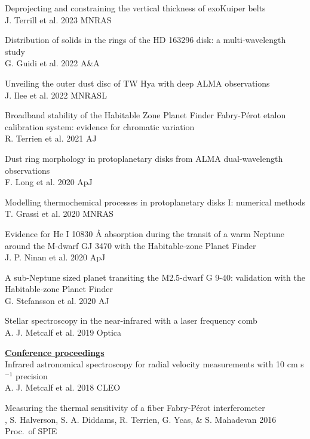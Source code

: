 \documentclass[10pt,preprint]{aastex}
\begin{document}
\noindent Deprojecting and constraining the vertical thickness of exoKuiper belts \\
\indent J. Terrill et al. 2023 MNRAS

\noindent Distribution of solids in the rings of the HD 163296 disk: a multi-wavelength study \\
\indent G. Guidi et al. 2022 A\&A 

\noindent Unveiling the outer dust disc of TW Hya with deep ALMA observations \\
\indent J. Ilee et al. 2022 MNRASL

\noindent Broadband stability of the Habitable Zone Planet Finder Fabry-P{\'e}rot etalon calibration system: evidence for chromatic variation \\
\indent R. Terrien et al. 2021 AJ 

\noindent Dust ring morphology in protoplanetary disks from ALMA dual-wavelength observations \\
\indent F. Long et al. 2020 ApJ 

\noindent Modelling thermochemical processes in protoplanetary
disks I: numerical methods \\
\indent T. Grassi et al. 2020 MNRAS

\noindent Evidence for He I 10830 \si{\angstrom} absorption during the transit of a warm Neptune around the M-dwarf GJ 3470 with the Habitable-zone Planet Finder \\
\indent J. P. Ninan et al. 2020 ApJ

\noindent A sub-Neptune sized planet transiting the M2.5-dwarf G 9-40: validation with the Habitable-zone Planet Finder \\
\indent G. Stefansson et al. 2020 AJ

\noindent Stellar spectroscopy in the near-infrared with a laser frequency comb \\
\indent A. J. Metcalf et al. 2019 Optica 

\noindent \underline{{\bf Conference proceedings}} \\
\noindent Infrared astronomical spectroscopy for radial velocity
measurements with 10 cm s$^{-1}$ precision \\
\indent A. J. Metcalf et al. 2018 CLEO

\noindent Measuring the thermal sensitivity of a fiber Fabry-P{\'e}rot interferometer \\
, S. Halverson, S. A. Diddams, R. Terrien, G. Ycas, \& S. Mahadevan 2016 Proc.~of SPIE
\end{document}
